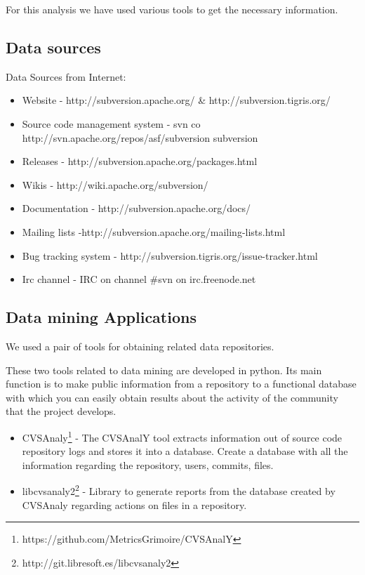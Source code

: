 \documentclass[11pt]{scrartcl}
\begin{document}
\par For this analysis we have used various tools to get the necessary information.

\subsection{Data sources}

Data Sources from Internet:

\begin{itemize}
    \item Website - http://subversion.apache.org/ \& http://subversion.tigris.org/
    \item Source code management system - svn co http://svn.apache.org/repos/asf/subversion subversion
    \item Releases - http://subversion.apache.org/packages.html
    \item Wikis - http://wiki.apache.org/subversion/
    \item Documentation - http://subversion.apache.org/docs/
    \item Mailing lists -http://subversion.apache.org/mailing-lists.html
    \item Bug tracking system - http://subversion.tigris.org/issue-tracker.html
    \item Irc channel - IRC on channel \#svn on irc.freenode.net
\end{itemize}

\subsection{Data mining Applications}

We used a pair of tools for obtaining related data repositories.

\par These two tools related to data mining are developed in python. Its main function is to make public information from a repository to a functional database with which you can easily obtain results about the activity of the community that the project develops.

\begin{itemize}
    \item CVSAnaly\footnote{https://github.com/MetricsGrimoire/CVSAnalY} - The CVSAnalY tool extracts information out of source code repository logs and stores it into a database. Create a database with all the information regarding the repository, users, commits, files.
    \item libcvsanaly2\footnote{http://git.libresoft.es/libcvsanaly2} - Library to generate reports from the database created by CVSAnaly regarding actions on files in a repository.
\end{itemize}
\end{document}
